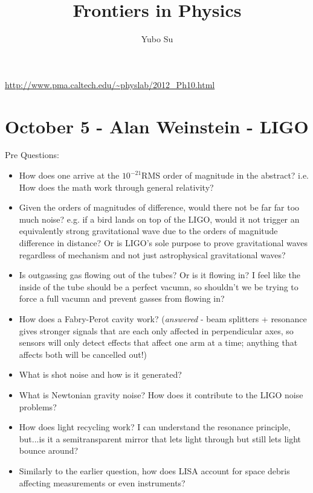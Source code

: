 \documentclass{report}
\begin{document}
\title{Frontiers in Physics}
\author{Yubo Su}
\date{ }

\maketitle

\tableofcontents

\url{http://www.pma.caltech.edu/~physlab/2012_Ph10.html}

\section{October 5 - Alan Weinstein - LIGO}

Pre Questions:
\begin{itemize}
\item How does one arrive at the $10^{-21} \mathrm{RMS}$ order of magnitude in the abstract? i.e. How does the math work through general relativity?
\item Given the orders of magnitudes of difference, would there not be far far too much noise? e.g. if a bird lands on top of the LIGO, would it not trigger an equivalently strong gravitational wave due to the orders of magnitude difference in distance? Or is LIGO's sole purpose to prove gravitational waves regardless of mechanism and not just astrophysical gravitational waves?
\item Is outgassing gas flowing out of the tubes? Or is it flowing in? I feel like the inside of the tube should be a perfect vacumn, so shouldn't we be trying to force a full vacumn and prevent gasses from flowing in?
\item How does a Fabry-Perot cavity work? (\emph{answered} - beam splitters + resonance gives stronger signals that are each only affected in perpendicular axes, so sensors will only detect effects that affect one arm at a time; anything that affects both will be cancelled out!)
\item What is shot noise and how is it generated?
\item What is Newtonian gravity noise? How does it contribute to the LIGO noise problems?
\item How does light recycling work? I can understand the resonance principle, but...is it a semitransparent mirror that lets light through but still lets light bounce around?
\item Similarly to the earlier question, how does LISA account for space debris affecting measurements or even instruments?
\end{itemize}
\end{document}
